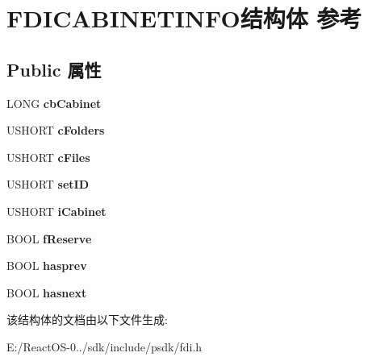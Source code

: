 \hypertarget{struct_f_d_i_c_a_b_i_n_e_t_i_n_f_o}{}\section{F\+D\+I\+C\+A\+B\+I\+N\+E\+T\+I\+N\+F\+O结构体 参考}
\label{struct_f_d_i_c_a_b_i_n_e_t_i_n_f_o}
\subsection*{Public 属性}
\begin{DoxyCompactItemize}
\item 
\mbox{\label{struct_f_d_i_c_a_b_i_n_e_t_i_n_f_o_afa74c05b9b782d1c5c9a46feddff4009}} 
L\+O\+NG {\bfseries cb\+Cabinet}
\item 
\mbox{\label{struct_f_d_i_c_a_b_i_n_e_t_i_n_f_o_aa296475daa92573b04020f5a44d0fed8}} 
U\+S\+H\+O\+RT {\bfseries c\+Folders}
\item 
\mbox{\label{struct_f_d_i_c_a_b_i_n_e_t_i_n_f_o_a8a983370c088b54c7fd3d7b9f48b9e7e}} 
U\+S\+H\+O\+RT {\bfseries c\+Files}
\item 
\mbox{\label{struct_f_d_i_c_a_b_i_n_e_t_i_n_f_o_a33cbca8def70f991cac74739c82318ea}} 
U\+S\+H\+O\+RT {\bfseries set\+ID}
\item 
\mbox{\label{struct_f_d_i_c_a_b_i_n_e_t_i_n_f_o_a7bc6b0d6e9a1bfeed9511f44cf240c68}} 
U\+S\+H\+O\+RT {\bfseries i\+Cabinet}
\item 
\mbox{\label{struct_f_d_i_c_a_b_i_n_e_t_i_n_f_o_ad281cc01761a074a92a8bbaca368570a}} 
B\+O\+OL {\bfseries f\+Reserve}
\item 
\mbox{\label{struct_f_d_i_c_a_b_i_n_e_t_i_n_f_o_a397a9863ea66742c0bfea14629fd6c64}} 
B\+O\+OL {\bfseries hasprev}
\item 
\mbox{\label{struct_f_d_i_c_a_b_i_n_e_t_i_n_f_o_ac4b5d5f8a7d7d21680c1ee5bd478c10e}} 
B\+O\+OL {\bfseries hasnext}
\end{DoxyCompactItemize}


该结构体的文档由以下文件生成\+:\begin{DoxyCompactItemize}
\item 
E\+:/\+React\+O\+S-\/0../sdk/include/psdk/fdi.\+h\end{DoxyCompactItemize}
